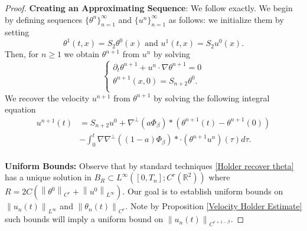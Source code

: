 \documentclass[12pt,xcolor=svgnames]{amsart}
\newcommand{\R}{\mathbb{R}}
\newcommand{\norm}[2]{\left\lVert#1\right\rVert_{#2}}
\begin{document}
 \begin{proof}
 \textbf{Creating an Approximating Sequence}: We follow \cite{1} exactly. We begin by defining sequences $\{\theta^n\}_{n=1}^{\infty}$ and $\{u^n\}_{n=1}^{\infty}$ as follows: we initialize them by setting
 \begin{equation}
 \label{initial holder sequence}
 \theta^1(t,x) = S_2\theta^0(x) \text{ and } u^1(t,x)=S_2u^0(x).
 \end{equation}
Then, for $n \geq 1$ we obtain $\theta^{n+1}$ from $u^n$ by solving
\begin{equation}
\label{Holder recover theta}
\begin{cases}
\partial_t \theta^{n+1} + u^n \cdot \nabla \theta^{n+1}=0\\
\theta^{n+1}(x,0)=S_{n+2}\theta^0.\\
\end{cases}
\end{equation}
We recover the velocity $u^{n+1}$ from $\theta^{n+1}$ 
by solving the following integral equation
\begin{align}
\label{Holder recover velocity}
u^{n+1}(t)&=S_{n+2}u^0 + \nabla^{\perp}(a\Phi_{\beta}) \ast (\theta^{n+1}(t)-\theta^{n+1}(0))\\
&- \int_0^t \nabla \nabla^{\perp} ((1-a)\Phi_{\beta}) \ast \cdot (\theta^{n+1}u^n)(\tau)d\tau \nonumber.
\end{align}
\\
\textbf{Uniform Bounds:}
Observe that by standard techniques \eqref{Holder recover theta}  has a unique solution in $B_R \subset L^{\infty}([0,T_n]; C^r(\R^2))$ where $R=2C(\norm{\theta^0}{C^r}+\norm{u^0}{L^{\infty}})$. Our goal is to establish uniform bounds on $\norm{u_n(t)}{L^{\infty}}$ and $\norm{\theta_n(t)}{C^r}$. Note by Proposition \ref{Velocity Holder Estimate} such bounds will imply a uniform bound on $\norm{u_n(t)}{C^{r+1-\beta}}$.

\end{proof}
\end{document}
